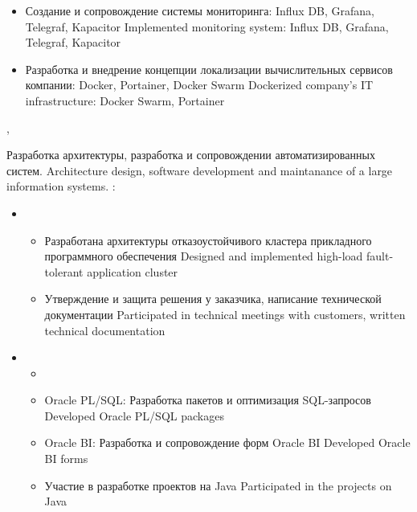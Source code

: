 \documentclass[11pt,a4paper,sans, russian]{moderncv}        %
\begin{document}
{\begin{itemize}
\begin{itemize}
				{Migrated development environment from Bitbucket, TeamCity to GitLab, Jenkins}			
			\item {}
				{Создание и сопровождение системы мониторинга: Influx DB, Grafana, Telegraf, Kapacitor}
				{Implemented monitoring system: Influx DB, Grafana, Telegraf, Kapacitor}
			\item {}
				{Разработка и внедрение концепции локализации вычислительных сервисов компании: Docker, Portainer, Docker Swarm}
				{Dockerized company's IT infrastructure: Docker Swarm, Portainer}
		\end{itemize}
	\end{itemize}
}


{\protect{}}
{\citymoscow, \country}
{}
{
	{Разработка архитектуры, разработка и сопровождении автоматизированных систем.}
	{Architecture design, software development and maintanance of a large information systems.}
  \newline{}
	\achievements:
	\begin{itemize}
	\item {}
		\begin{itemize}
		\item {}
			{Разработана архитектуры отказоустойчивого кластера прикладного программного обеспечения}
			{Designed and implemented high-load fault-tolerant application cluster}
		\item {}
			{Утверждение и защита решения у заказчика, написание технической документации}
			{Participated in technical meetings with customers, written technical documentation}
		\end{itemize}
	\item {}
		\begin{itemize}
			\item {}
			\item {}
				{Oracle PL/SQL: Разработка пакетов и оптимизация SQL-запросов}
				{Developed Oracle PL/SQL packages}
			\item {}
				{Oracle BI: Разработка и сопровождение форм Oracle BI}
				{Developed Oracle BI forms}
			\item {}
				{Участие в разработке проектов на Java}
				{Participated in the projects on Java}

\end{itemize}
\end{itemize}}
\end{document}
